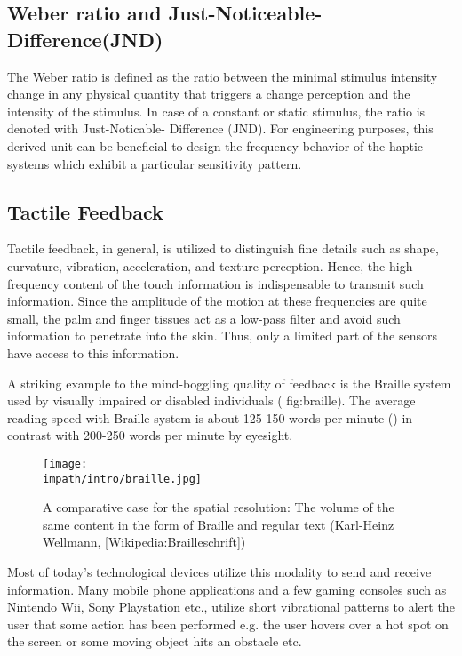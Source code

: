 \subsection{Weber ratio and Just-Noticeable-Difference(JND) }

The Weber ratio is defined as the ratio between the minimal stimulus intensity change in any physical quantity that triggers a change 
perception and the intensity of the stimulus. In case of a constant or static stimulus, the ratio is denoted with Just-Noticable-
Difference (JND). For engineering purposes, this derived unit can be beneficial to design the frequency behavior of the haptic systems 
which exhibit a particular sensitivity pattern.


\subsection{Tactile Feedback}

Tactile feedback, in general, is utilized to distinguish fine details such as shape, curvature, vibration, acceleration, and texture 
perception. Hence, the high-frequency content of the touch information is indispensable to transmit such information. Since the amplitude 
of the motion at these frequencies are quite small, the palm and finger tissues act as a low-pass filter and avoid such information to 
penetrate into the skin. Thus, only a limited part of the sensors have access to this information.

A striking example to the mind-boggling quality of feedback is the Braille system used by visually impaired or disabled individuals (\Cref
{fig:braille}). The average reading speed with Braille system is about 125-150 words per minute (\cite{americanblind}) in contrast with 
200-250 words per minute by eyesight. 

\begin{figure}%
\centering
\texttt{[image: \\impath/intro/braille.jpg]}%
\caption[The length comparison of the same content in the form of Braille and 
regular text]{A comparative case for the spatial resolution: The volume of the same 
content in the form of Braille and regular text (Karl-Heinz Wellmann, 
\href{http://de.wikipedia.org/wiki/Brailleschrift}{[Wikipedia:Brailleschrift]})}%
\label{fig:braille}%
\end{figure}

Most of today's technological devices utilize this modality to send and receive information. Many mobile phone applications and a few 
gaming consoles such as Nintendo Wii\raisebox{0.5ex}{\scriptsize\texttrademark}, Sony Playstation\raisebox{0.5ex}{
\scriptsize\texttrademark} etc., utilize short vibrational patterns to alert the user that some action has been performed e.g. the user 
hovers over a hot spot on the screen or some moving object hits an obstacle etc. 

